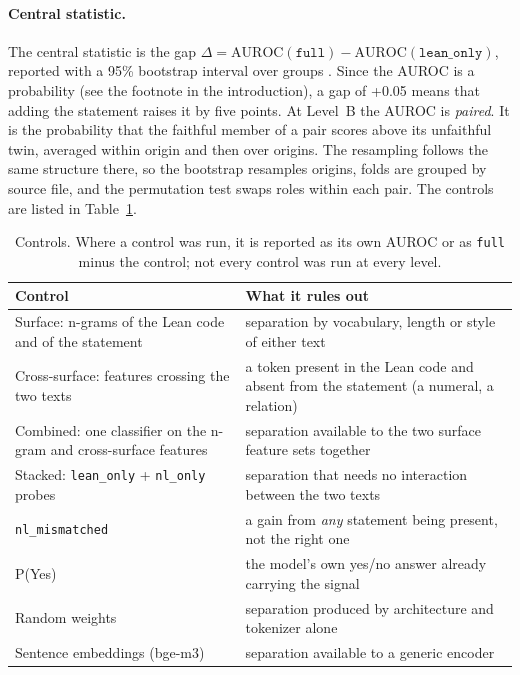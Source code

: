 \documentclass[10pt]{article}
\newcommand{\vr}[1]{\texttt{#1}}
\newcommand{\D}{\Delta}
\begin{document}
\paragraph{Central statistic.}
The central statistic is the gap
$\D = \mathrm{AUROC}(\vr{full}) - \mathrm{AUROC}(\vr{lean\_only})$, reported with a 95\% bootstrap interval over groups \citep{efron}.
Since the AUROC is a probability (see the footnote in the introduction), a gap of +0.05 means that adding the
statement raises it by five points.
At Level~B the AUROC is \emph{paired}. It is the probability that the faithful member of a pair scores above its
unfaithful twin, averaged within origin and then over origins. The resampling follows the same structure there, so
the bootstrap resamples origins, folds are grouped by source file, and the permutation test swaps roles within each
pair.
The controls are listed in Table~\ref{tab:controles}.

\begin{table}[h]
\centering
\caption{Controls. Where a control was run, it is reported as its own AUROC or as \vr{full} minus the control; not every control was run at every level.}
\label{tab:controles}
\vspace{2pt}
\begin{tabularx}{\linewidth}{@{}lX@{}}
\toprule
Control & What it rules out\\
\midrule
Surface: n-grams of the Lean code and of the statement & separation by vocabulary, length or style of either text\\
Cross-surface: features crossing the two texts & a token present in the Lean code and absent from the statement (a numeral, a relation)\\
Combined: one classifier on the n-gram and cross-surface features & separation available to the two surface feature sets together\\
Stacked: \vr{lean\_only} + \vr{nl\_only} probes & separation that needs no interaction between the two texts\\
\vr{nl\_mismatched} & a gain from \emph{any} statement being present, not the right one\\
P(Yes) & the model's own yes/no answer already carrying the signal\\
Random weights & separation produced by architecture and tokenizer alone\\
Sentence embeddings (bge-m3) & separation available to a generic encoder\\
\bottomrule
\end{tabularx}
\end{table}
\end{document}
